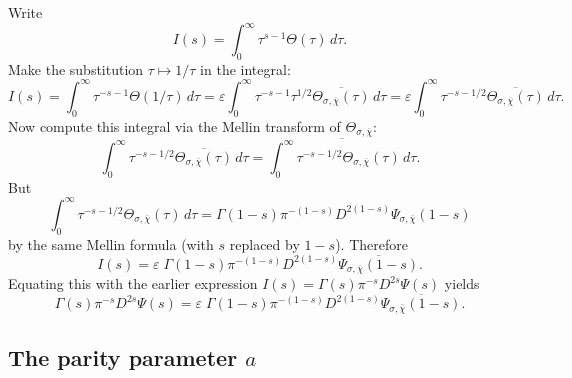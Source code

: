 \documentclass[12pt,a4paper]{article}
\theoremstyle{definition}
\theoremstyle{remark}
\begin{document}
Write
\[
I(s)=\int_0^\infty\tau^{s-1}\Theta(\tau)\,d\tau.
\]
Make the substitution $\tau\mapsto1/\tau$ in the integral:
\[
I(s)=\int_0^\infty\tau^{-s-1}\Theta(1/\tau)\,d\tau
= \varepsilon\int_0^\infty\tau^{-s-1}\tau^{1/2}
  \overline{\Theta_{\sigma,\overline{\chi}}(\tau)}\,d\tau
= \varepsilon\int_0^\infty\tau^{-s-1/2}
  \overline{\Theta_{\sigma,\overline{\chi}}(\tau)}\,d\tau.
\]
Now compute this integral via the Mellin transform of
$\Theta_{\sigma,\overline{\chi}}$:
\[
\int_0^\infty\tau^{-s-1/2}
  \overline{\Theta_{\sigma,\overline{\chi}}(\tau)}\,d\tau
= \overline{\int_0^\infty\tau^{-s-1/2}
  \Theta_{\sigma,\overline{\chi}}(\tau)\,d\tau}.
\]
But
\[
\int_0^\infty\tau^{-s-1/2}
  \Theta_{\sigma,\overline{\chi}}(\tau)\,d\tau
= \Gamma(1-s)\pi^{-(1-s)}D^{2(1-s)}\Psi_{\sigma,\overline{\chi}}(1-s)
\]
by the same Mellin formula (with $s$ replaced by $1-s$). Therefore
\[
I(s)=\varepsilon\;\Gamma(1-s)\pi^{-(1-s)}D^{2(1-s)}
  \overline{\Psi_{\sigma,\overline{\chi}}(1-s)}.
\]
Equating this with the earlier expression $I(s)=\Gamma(s)\pi^{-s}D^{2s}\Psi(s)$
yields
\[
\Gamma(s)\pi^{-s}D^{2s}\Psi(s)
  =\varepsilon\;\Gamma(1-s)\pi^{-(1-s)}D^{2(1-s)}
  \overline{\Psi_{\sigma,\overline{\chi}}(1-s)}.
\]

\subsection{The parity parameter $a$}\label{sec:parity}
\label{sec:rootnumber}
\end{document}
